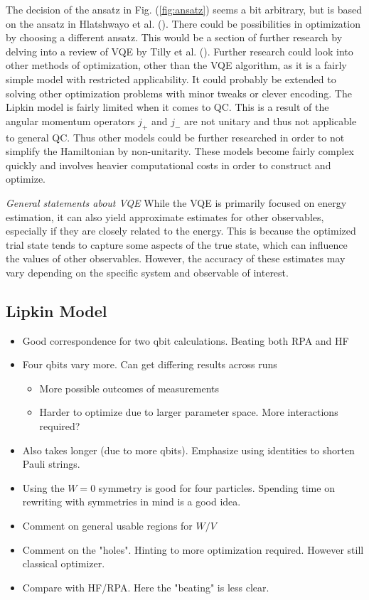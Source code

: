 The decision of the ansatz in Fig. (\ref{fig:ansatz}) seems a bit arbitrary, but is based on the ansatz in Hlatshwayo et al. (\cite{hlatshwayoSimulatingExcitedStates2022}). There could be possibilities in optimization by choosing a different ansatz. This would be a section of further research by delving into a review of VQE by Tilly et al. (\cite{VQE_review}). \newline 
Further research could look into other methods of optimization, other than the VQE algorithm, as it is a fairly simple model with restricted applicability. It could probably be extended to solving other optimization problems with minor tweaks or clever encoding. The Lipkin model is fairly limited when it comes to QC. This is a result of the angular momentum operators $j_+$ and $j_-$ are not unitary and thus not applicable to general QC. Thus other models could be further researched in order to not simplify the Hamiltonian by non-unitarity. These models become fairly complex quickly and involves heavier computational costs in order to construct and optimize.  

\textit{General statements about VQE}
While the VQE is primarily focused on energy estimation, it can also yield approximate estimates for other observables, especially if they are closely related to the energy. This is because the optimized trial state tends to capture some aspects of the true state, which can influence the values of other observables. However, the accuracy of these estimates may vary depending on the specific system and observable of interest.

\subsection{Lipkin Model}
\begin{itemize}
    \item Good correspondence for two qbit calculations. Beating both RPA and HF 
    \item Four qbits vary more. Can get differing results across runs \begin{itemize}
        \item More possible outcomes of measurements
        \item Harder to optimize due to larger parameter space. More interactions required?
    \end{itemize}  
    \item Also takes longer (due to more qbits). Emphasize using identities to shorten Pauli strings.
    \item Using the $W=0$ symmetry is good for four particles. Spending time on rewriting with symmetries in mind is a good idea. 
    \item Comment on general usable regions for $W/V$
    \item Comment on the "holes". Hinting to more optimization required. However still classical optimizer. 
    \item Compare with HF/RPA. Here the "beating" is less clear.
\end{itemize}